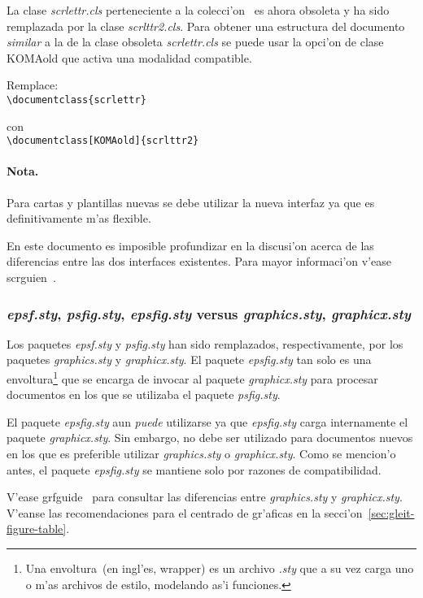 \documentclass[11pt,a4paper,pagesize,tablecaptionabove,abstracton,pointlessnumbers]{scrartcl}
\newcommand{\gl}{\guillemotleft}
\newcommand{\gr}{\guillemotright}
\newcommand{\Doku}[1]{\textsf{#1}\xspace}
\newcommand{\Paket}[1]{\textsf{\textsl{#1.sty}}\xspace}
\newcommand{\Klasse}[1]{\textsf{\textsl{#1.cls}}\xspace}
\newcommand{\Option}[1]{\textsf{#1}\xspace}
\newcommand{\Ersetzx}[3][.5\textwidth]{%
  \par\noindent%
  \begin{minipage}[t]{#1}
    \raggedright
    Remplace:\\
    \textcolor{rot}{#2}
  \end{minipage}%
  \hfill%
  \begin{minipage}[t]{(\linewidth - #1)-.02\linewidth}
    \raggedright
    con\\
    \textcolor{gruen}{#3}
  \end{minipage}%
}
\begin{document}
La clase \Klasse{scrlettr} perteneciente a la colecci'on \KOMAScript\ es ahora obsoleta y ha sido remplazada por la clase \Klasse{scrlttr2}. Para obtener una estructura del documento \emph{similar} a la de la clase obsoleta \Klasse{scrlettr} se puede usar la opci'on de clase \Option{KOMAold} que activa una modalidad compatible.

\Ersetzx[\wd\Breite]{\texttt{\textbackslash documentclass\{scrlettr\}}}%
{\texttt{\textbackslash documentclass[KOMAold]\{scrlttr2\}}}

\paragraph{Nota.}
\label{sec:anmerkung-3}

Para cartas y plantillas nuevas se debe utilizar la nueva interfaz ya que es definitivamente m'as flexible.

En este documento es imposible profundizar en la discusi'on acerca de las diferencias entre las dos interfaces existentes. Para mayor informaci'on v'ease \Doku{scrguien}~\cite{kohm:03}.

\subsubsection{\Paket{epsf}, \Paket{psfig}, \Paket{epsfig} versus
  \Paket{graphics}, \Paket{graphicx}}
\label{sec:grafikeinbindung}

Los paquetes \Paket{epsf} y \Paket{psfig} han sido remplazados, respectivamente, por los paquetes \Paket{graphics} y \Paket{graphicx}. El paquete \Paket{epsfig} tan solo es una \gl envoltura\gr\footnote{Una \gl envoltura\gr\ (en ingl'es, \gl wrapper\gr) es un archivo \Paket{} que a su vez carga uno o m'as archivos de estilo, modelando as'i funciones.} que se encarga de invocar al paquete \Paket{graphicx} para procesar documentos en los que se utilizaba el paquete \Paket{psfig}.

El paquete \Paket{epsfig} aun \emph{puede} utilizarse ya que \Paket{epsfig} carga internamente el paquete \Paket{graphicx}. Sin embargo, no debe ser utilizado para documentos nuevos en los que es preferible utilizar \Paket{graphics} o \Paket{graphicx}. Como se mencion'o antes, el paquete \Paket{epsfig} se mantiene solo por razones de compatibilidad.

V'ease \Doku{grfguide}~\cite{graphicx:99} para consultar las diferencias entre \Paket{graphics} y \Paket{graphicx}. V'eanse las recomendaciones para el centrado de gr'aficas en la secci'on~\vref{sec:gleit-figure-table}.
\end{document}
